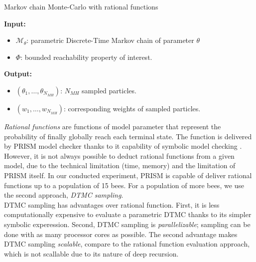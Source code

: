 \begin{algorithm}[H]
      \caption{Markov chain Monte-Carlo with rational functions}
      \label{rf-mcmc-alg}
      \hspace*{\algorithmicindent} \textbf{Input:}
      \begin{itemize}
            \item $\mathcal{M}_\theta$: parametric Discrete-Time Markov chain of parameter $\theta$
            \item $\Phi$: bounded reachability property of interest.
      \end{itemize}
      \hspace*{\algorithmicindent} \textbf{Output:}
      \begin{itemize}
            \item $(\theta_1,\ldots,\theta_{N_{MH}})$: $N_{MH}$ sampled particles.
            \item $(w_1,\ldots,w_{N_{MH}})$: corresponding weights of sampled particles.
      \end{itemize}
      \begin{algorithmic}[1]
            \EndProcedure
      \end{algorithmic}
\end{algorithm}


\textit{Rational functions} are functions of model parameter that represent the
probability of finally globally reach each terminal state. The function is
delivered by PRISM model checker thanks to it capability of symbolic model
checking \cite{KNP11}.\\
However, it is not always possible to deduct rational functions from a given
model, due to the technical limitation (time, memory) and the limitation of
PRISM itself. In our conducted experiment, PRISM is capable of deliver rational
functions up to a population of 15 bees. For a population of more bees, we use
the second approach, \textit{DTMC sampling}.\\
DTMC sampling has advantages over rational function. First, it is less
computationally expensive to evaluate a parametric DTMC thanks to its simpler
symbolic experession. Second, DTMC sampling is \textit{parallelizable}; sampling
can be done with as many processor cores as possible. The second advantage makes
DTMC sampling \textit{scalable}, compare to the rational function evaluation
approach, which is not scallable due to its nature of deep recursion.

